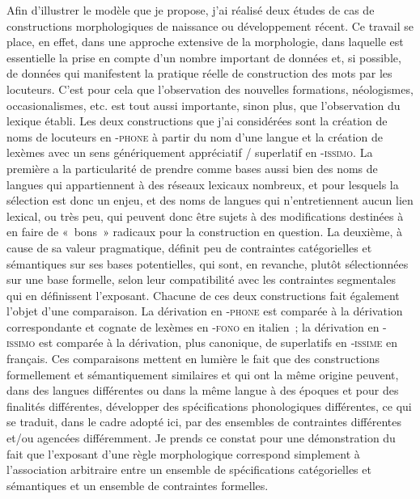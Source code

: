 \documentclass[output=paper]{langsci/langscibook}
\begin{document}
Afin d'illustrer le modèle que je propose, j'ai réalisé deux études de
cas de constructions morphologiques de naissance ou développement
récent. Ce travail se place, en effet, dans une approche extensive de la
morphologie, dans laquelle est essentielle la prise en compte d'un
nombre important de données et, si possible, de données qui manifestent
la pratique réelle de construction des mots par les locuteurs. C'est
pour cela que l'observation des nouvelles formations, néologismes,
occasionalismes, etc. est tout aussi importante, sinon plus, que
l'observation du lexique établi. Les deux constructions que j'ai
considérées sont la création de noms de locuteurs en -\textsc{phone} à
partir du nom d'une langue et la création de lexèmes avec un sens
génériquement appréciatif / superlatif en -\textsc{issimo}. La première
a la particularité de prendre comme bases aussi bien des noms de langues
qui appartiennent à des réseaux lexicaux nombreux, et pour lesquels la
sélection est donc un enjeu, et des noms de langues qui n'entretiennent
aucun lien lexical, ou très peu, qui peuvent donc être sujets à des
modifications destinées à en faire de «~bons~» radicaux pour la
construction en question. La deuxième, à cause de sa valeur pragmatique,
définit peu de contraintes catégorielles et sémantiques sur ses bases
potentielles, qui sont, en revanche, plutôt sélectionnées sur une base
formelle, selon leur compatibilité avec les contraintes segmentales qui
en définissent l'exposant. Chacune de ces deux constructions fait
également l'objet d'une comparaison. La dérivation en -\textsc{phone}
est comparée à la dérivation correspondante et cognate de lexèmes en
-\textsc{fono} en italien~; la dérivation en -\textsc{issimo} est
comparée à la dérivation, plus canonique, de superlatifs en
‑\textsc{issime} en français. Ces comparaisons mettent en lumière le
fait que des constructions formellement et sémantiquement similaires et
qui ont la même origine peuvent, dans des langues différentes ou dans la
même langue à des époques et pour des finalités différentes, développer
des spécifications phonologiques différentes, ce qui se traduit, dans le
cadre adopté ici, par des ensembles de contraintes différentes et/ou
agencées différemment. Je prends ce constat pour une
démonstration du fait que l'exposant d'une règle morphologique
correspond simplement à l'association arbitraire entre un ensemble de
spécifications catégorielles et sémantiques et un ensemble de
contraintes formelles.
\end{document}
